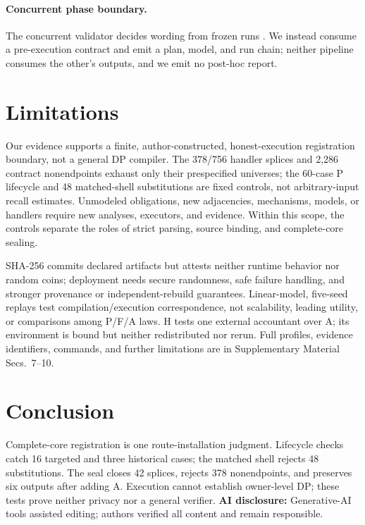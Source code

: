 \documentclass[letterpaper]{article}
\begin{document}
\paragraph{Concurrent phase boundary.}
The concurrent validator decides wording from frozen runs
\citep{anonymous2026audit}.  We instead consume a pre-execution contract and
emit a plan, model, and run chain; neither pipeline consumes the other's
outputs, and we emit no post-hoc report.

\section{Limitations}

Our evidence supports a finite, author-constructed, honest-execution
registration boundary, not a general DP compiler.  The 378/756 handler
splices and 2,286 contract nonendpoints exhaust only their prespecified
universes; the 60-case P lifecycle and 48 matched-shell substitutions are fixed
controls, not arbitrary-input recall estimates.  Unmodeled obligations, new
adjacencies, mechanisms, models, or handlers require new analyses, executors,
and evidence.  Within this scope, the controls separate the roles of strict
parsing, source binding, and complete-core sealing.

SHA-256 commits declared artifacts but attests neither runtime behavior nor
random coins; deployment needs secure randomness, safe failure handling, and
stronger provenance or independent-rebuild guarantees.  Linear-model, five-seed
replays test compilation/execution correspondence, not scalability, leading
utility, or comparisons among P/F/A laws.  H tests one external accountant over
A; its environment is bound but neither redistributed nor rerun.  Full profiles,
evidence identifiers, commands, and further limitations are in Supplementary
Material Secs.~7--10.

\section{Conclusion}

Complete-core registration is one route-installation judgment.  Lifecycle checks
catch 16 targeted and three historical cases; the matched shell rejects 48
substitutions.  The seal closes 42 splices, rejects 378 nonendpoints, and preserves
six outputs after adding A.  Execution cannot establish owner-level DP; these
tests prove neither privacy nor a general verifier.  \textbf{AI disclosure:}
Generative-AI tools assisted editing; authors verified all content and remain
responsible.


\end{document}
